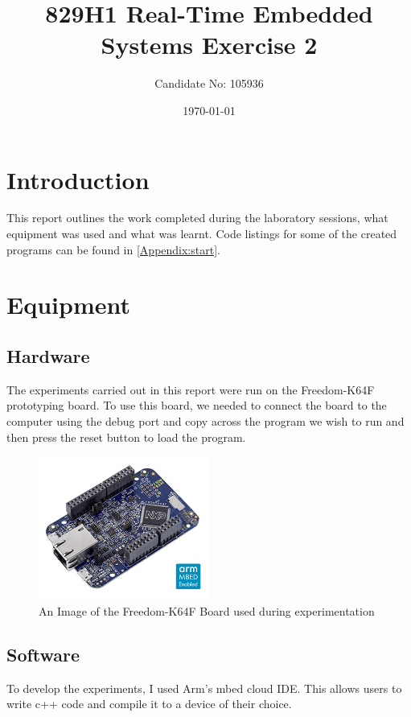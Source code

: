 \documentclass[a4paper,12pt]{scrartcl}
\title{829H1 Real-Time Embedded Systems Exercise 2}
\author{Candidate No: 105936}
\date{\today}
\begin{document}
	
	\begin{titlepage}
		\maketitle
	\end{titlepage}
	
	\tableofcontents
	\newpage
	
	\section{Introduction}
	{
		This report outlines the work completed during the laboratory sessions, what equipment was used and what was learnt. Code listings for some of the created programs can be found in \cref{Appendix:start}.
	}

	\section{Equipment}
	{
		\subsection{Hardware}{
			The experiments carried out in this report were run on the Freedom-K64F prototyping board\cite{nxpproducts2014}. To use this board, we needed to connect the board to the computer using the debug port and copy across the program we wish to run and then press the reset button to load the program.
			\begin{figure}[h]
				\centering
				\includegraphics[width=0.5\textwidth]{FRDM-K64F-ANGLE}
				\caption{An Image of the Freedom-K64F Board used during experimentation\cite{nxpproducts2014}}
				\label{img:FRDM-K64F}
			\end{figure}
		}
		\subsection{Software}
		{
			To develop the experiments, I used Arm's mbed cloud IDE. This allows users to write c++ code and compile it to a device of their choice. 
		}
	}
	
\end{document}

